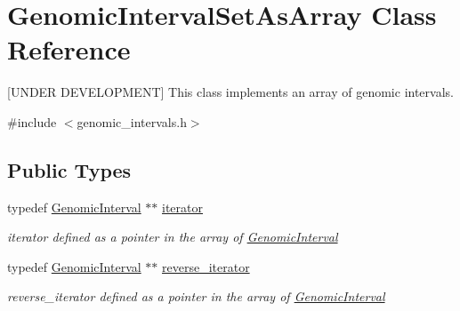 \hypertarget{classGenomicIntervalSetAsArray}{
\section{GenomicIntervalSetAsArray Class Reference}
\label{classGenomicIntervalSetAsArray}
}


\mbox{[}UNDER DEVELOPMENT\mbox{]} This class implements an array of genomic intervals.  




{\ttfamily \#include $<$genomic\_\-intervals.h$>$}

\subsection*{Public Types}
\begin{DoxyCompactItemize}
\item 
\hypertarget{classGenomicIntervalSetAsArray_a1a0416c9fac7e9d965ae7fe84f1649c2}{
typedef \hyperlink{classGenomicInterval}{GenomicInterval} $\ast$$\ast$ \hyperlink{classGenomicIntervalSetAsArray_a1a0416c9fac7e9d965ae7fe84f1649c2}{iterator}}
\label{classGenomicIntervalSetAsArray_a1a0416c9fac7e9d965ae7fe84f1649c2}

\begin{DoxyCompactList}\small\item\em iterator defined as a pointer in the array of \hyperlink{classGenomicInterval}{GenomicInterval} \end{DoxyCompactList}\item 
\hypertarget{classGenomicIntervalSetAsArray_a0310f5d79c529b631a5ef71ef186b41c}{
typedef \hyperlink{classGenomicInterval}{GenomicInterval} $\ast$$\ast$ \hyperlink{classGenomicIntervalSetAsArray_a0310f5d79c529b631a5ef71ef186b41c}{reverse\_\-iterator}}
\label{classGenomicIntervalSetAsArray_a0310f5d79c529b631a5ef71ef186b41c}

\begin{DoxyCompactList}\small\item\em reverse\_\-iterator defined as a pointer in the array of \hyperlink{classGenomicInterval}{GenomicInterval} \end{DoxyCompactList}\end{DoxyCompactItemize}

